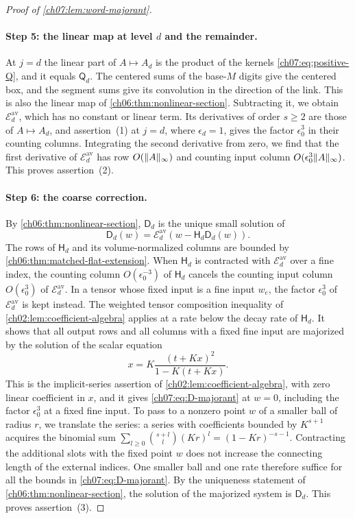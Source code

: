 \begin{proof}[Proof of \cref{ch07:lem:word-majorant}]
\paragraph{Step 5: the linear map at level $d$ and the remainder.}
At $j=d$ the linear part of $A\mapsto A_d$ is the product of the kernels \eqref{ch07:eq:positive-Q}, and it equals $\mathsf Q_d$. The centered sums of the base-$M$ digits give the centered box, and the segment sums give its convolution in the direction of the link. This is also the linear map of \cref{ch06:thm:nonlinear-section}. Subtracting it, we obtain $\mathscr E_d^{\mathrm{av}}$, which has no constant or linear term. Its derivatives of order $s\ge2$ are those of $A\mapsto A_d$, and assertion~(1) at $j=d$, where $\epsilon_d=1$, gives the factor $\epsilon_0^3$ in their counting columns. Integrating the second derivative from zero, we find that the first derivative of $\mathscr E_d^{\mathrm{av}}$ has row $O(\lVert A\rVert_\infty)$ and counting input column $O(\epsilon_0^3\lVert A\rVert_\infty)$. This proves assertion~(2).

\paragraph{Step 6: the coarse correction.}
By \cref{ch06:thm:nonlinear-section}, $\mathsf D_d$ is the unique small solution of
\[
 \mathsf D_d(w)=\mathscr E_d^{\mathrm{av}}(w-\mathsf H_d\mathsf D_d(w)).
\]
The rows of $\mathsf H_d$ and its volume-normalized columns are bounded by \cref{ch06:thm:matched-flat-extension}. When $\mathsf H_d$ is contracted with $\mathscr E_d^{\mathrm{av}}$ over a fine index, the counting column $O(\epsilon_0^{-3})$ of $\mathsf H_d$ cancels the counting input column $O(\epsilon_0^3)$ of $\mathscr E_d^{\mathrm{av}}$. In a tensor whose fixed input is a fine input $w_e$, the factor $\epsilon_0^3$ of $\mathscr E_d^{\mathrm{av}}$ is kept instead. The weighted tensor composition inequality of \cref{ch02:lem:coefficient-algebra} applies at a rate below the decay rate of $\mathsf H_d$. It shows that all output rows and all columns with a fixed fine input are majorized by the solution of the scalar equation
\[
 x=K\frac{(t+Kx)^2}{1-K(t+Kx)} .
\]
This is the implicit-series assertion of \cref{ch02:lem:coefficient-algebra}, with zero linear coefficient in $x$, and it gives \eqref{ch07:eq:D-majorant} at $w=0$, including the factor $\epsilon_0^3$ at a fixed fine input. To pass to a nonzero point $w$ of a smaller ball of radius $r$, we translate the series: a series with coefficients bounded by $K^{s+1}$ acquires the binomial sum $\sum_{l\ge0}\binom{s+l}{l}(Kr)^l=(1-Kr)^{-s-1}$. Contracting the additional slots with the fixed point $w$ does not increase the connecting length of the external indices. One smaller ball and one rate therefore suffice for all the bounds in \eqref{ch07:eq:D-majorant}. By the uniqueness statement of \cref{ch06:thm:nonlinear-section}, the solution of the majorized system is $\mathsf D_d$. This proves assertion~(3).


\end{proof}
